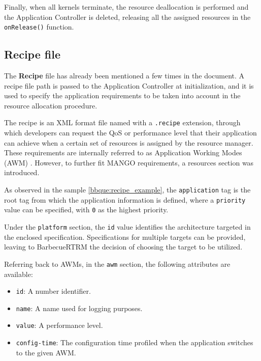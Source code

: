 Finally, when all kernels terminate, the resource deallocation is performed and the Application Controller is deleted, releasing all the assigned resources in the \linebreak \texttt{onRelease()} function.

\subsection{Recipe file} \label{bbque:recipe}

The \textbf{Recipe} file has already been mentioned a few times in the document. A recipe file path is passed to the Application Controller at initialization, and it is used to specify the application requirements to be taken into account in the resource allocation procedure.

The recipe is an XML \cite{xml} format file named with a \texttt{.recipe} extension, through which developers can request the QoS or performance level that their application can achieve when a certain set of resources is assigned by the resource manager. These requirements are internally referred to as Application Working Modes (AWM) \cite{mango_exploring_manycore_architectures}. However, to further fit MANGO requirements, a resources section was introduced.

As observed in the sample \ref{bbque:recipe_example}, the \texttt{application} tag is the root tag from which the application information is defined, where a \texttt{priority} value can be specified, with \texttt{0} as the highest priority.

Under the \texttt{platform} section, the \texttt{id} value identifies the architecture targeted in the enclosed specification. Specifications for multiple targets can be provided, leaving to BarbecueRTRM the decision of choosing the target to be utilized.

Referring back to AWMs, in the \texttt{awm} section, the following attributes are available:

\begin{itemize}
    \item \texttt{id}: A number identifier.
    \item \texttt{name}: A name used for logging purposes.
    \item \texttt{value}: A performance level.
    \item \texttt{config-time}: The configuration time profiled when the application switches to the given AWM.
\end{itemize}

